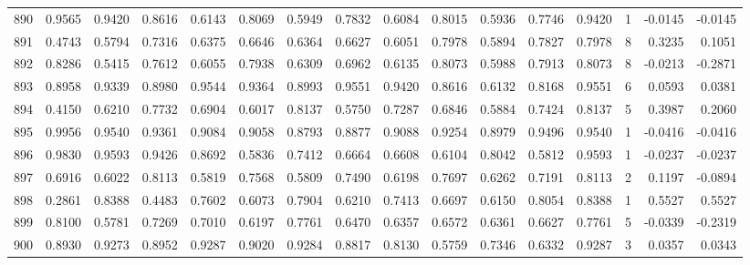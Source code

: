 \begin{tabular}{lrrrrrrrrrrrrrrr}
890 &      0.9565 &  0.9420 &  0.8616 &  0.6143 &  0.8069 &  0.5949 &  0.7832 &  0.6084 &  0.8015 &  0.5936 &   0.7746 &     0.9420 &      1 &                   -0.0145 &                    -0.0145 \\
891 &      0.4743 &  0.5794 &  0.7316 &  0.6375 &  0.6646 &  0.6364 &  0.6627 &  0.6051 &  0.7978 &  0.5894 &   0.7827 &     0.7978 &      8 &                    0.3235 &                     0.1051 \\
892 &      0.8286 &  0.5415 &  0.7612 &  0.6055 &  0.7938 &  0.6309 &  0.6962 &  0.6135 &  0.8073 &  0.5988 &   0.7913 &     0.8073 &      8 &                   -0.0213 &                    -0.2871 \\
893 &      0.8958 &  0.9339 &  0.8980 &  0.9544 &  0.9364 &  0.8993 &  0.9551 &  0.9420 &  0.8616 &  0.6132 &   0.8168 &     0.9551 &      6 &                    0.0593 &                     0.0381 \\
894 &      0.4150 &  0.6210 &  0.7732 &  0.6904 &  0.6017 &  0.8137 &  0.5750 &  0.7287 &  0.6846 &  0.5884 &   0.7424 &     0.8137 &      5 &                    0.3987 &                     0.2060 \\
895 &      0.9956 &  0.9540 &  0.9361 &  0.9084 &  0.9058 &  0.8793 &  0.8877 &  0.9088 &  0.9254 &  0.8979 &   0.9496 &     0.9540 &      1 &                   -0.0416 &                    -0.0416 \\
896 &      0.9830 &  0.9593 &  0.9426 &  0.8692 &  0.5836 &  0.7412 &  0.6664 &  0.6608 &  0.6104 &  0.8042 &   0.5812 &     0.9593 &      1 &                   -0.0237 &                    -0.0237 \\
897 &      0.6916 &  0.6022 &  0.8113 &  0.5819 &  0.7568 &  0.5809 &  0.7490 &  0.6198 &  0.7697 &  0.6262 &   0.7191 &     0.8113 &      2 &                    0.1197 &                    -0.0894 \\
898 &      0.2861 &  0.8388 &  0.4483 &  0.7602 &  0.6073 &  0.7904 &  0.6210 &  0.7413 &  0.6697 &  0.6150 &   0.8054 &     0.8388 &      1 &                    0.5527 &                     0.5527 \\
899 &      0.8100 &  0.5781 &  0.7269 &  0.7010 &  0.6197 &  0.7761 &  0.6470 &  0.6357 &  0.6572 &  0.6361 &   0.6627 &     0.7761 &      5 &                   -0.0339 &                    -0.2319 \\
900 &      0.8930 &  0.9273 &  0.8952 &  0.9287 &  0.9020 &  0.9284 &  0.8817 &  0.8130 &  0.5759 &  0.7346 &   0.6332 &     0.9287 &      3 &                    0.0357 &                     0.0343 \\

\end{tabular}
